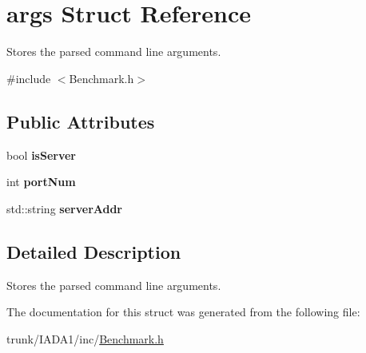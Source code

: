 \hypertarget{structargs}{\section{args Struct Reference}
\label{structargs}
}


Stores the parsed command line arguments.  




{\ttfamily \#include $<$Benchmark.\-h$>$}

\subsection*{Public Attributes}
\begin{DoxyCompactItemize}
\item 
\hypertarget{structargs_a49450e8afc537c2540147d5a941ecb2b}{bool {\bfseries is\-Server}}\label{structargs_a49450e8afc537c2540147d5a941ecb2b}

\item 
\hypertarget{structargs_a35e0de378159cc476094e7f7cc336c0d}{int {\bfseries port\-Num}}\label{structargs_a35e0de378159cc476094e7f7cc336c0d}

\item 
\hypertarget{structargs_a4fe11cc70aab217e705e827ba79f83e0}{std\-::string {\bfseries server\-Addr}}\label{structargs_a4fe11cc70aab217e705e827ba79f83e0}

\end{DoxyCompactItemize}


\subsection{Detailed Description}
Stores the parsed command line arguments. 

The documentation for this struct was generated from the following file\-:\begin{DoxyCompactItemize}
\item 
trunk/\-I\-A\-D\-A1/inc/\hyperlink{_benchmark_8h}{Benchmark.\-h}\end{DoxyCompactItemize}
